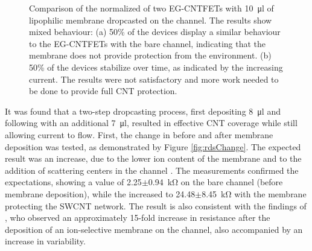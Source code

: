 \begin{figure}
    \centering
    \caption{
        Comparison of the normalized \ids{} of two EG-CNTFETs with \SI{10}{\micro\l} of lipophilic membrane dropcasted on the channel. The results show mixed behaviour: 
        (a) 50\% of the devices display a similar behaviour to the EG-CNTFETs with the bare channel, indicating that the membrane does not provide protection from the environment.
        (b) 50\% of the devices stabilize over time, as indicated by the increasing current. The results were not satisfactory and more work needed to be done to provide full CNT protection.}
    \label{fig:membrane10ul}
\end{figure}

It was found that a two-step dropcasting process, \ie{} first depositing \SI{8}{\ul} and following with an additional \SI{7}{\ul}, resulted in effective CNT coverage while still allowing current to flow.
First, the change in \rds{} before and after membrane deposition was tested, as demonstrated by Figure \ref{fig:rdsChange}. The expected result was an increase, due to the lower ion content of the membrane and to the addition of scattering centers in the channel \citep{joshiUnderstanding2018}. The measurements confirmed the expectations, showing a value of \SI{2.25}{}$\pm$\SI{0.94}{\kohm} on the bare channel (before membrane deposition), while the \rds{} increased to \SI{24.48}{}$\pm$\SI{8.45}{\kohm} with the membrane protecting the SWCNT network. The result is also consistent with the findings of \citet{petrelliMethod2023}, who observed an approximately 15-fold increase in resistance after the deposition of an ion-selective membrane on the channel, also accompanied by an increase in variability.

